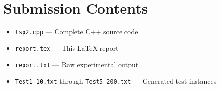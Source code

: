 \documentclass[12pt,a4paper]{article}
\begin{document}
\section{Submission Contents}

\begin{itemize}
    \item \texttt{tsp2.cpp} --- Complete C++ source code
    \item \texttt{report.tex} --- This LaTeX report
    \item \texttt{report.txt} --- Raw experimental output
    \item \texttt{Test1\_10.txt} through \texttt{Test5\_200.txt} --- Generated test instances
\end{itemize}
\end{document}
